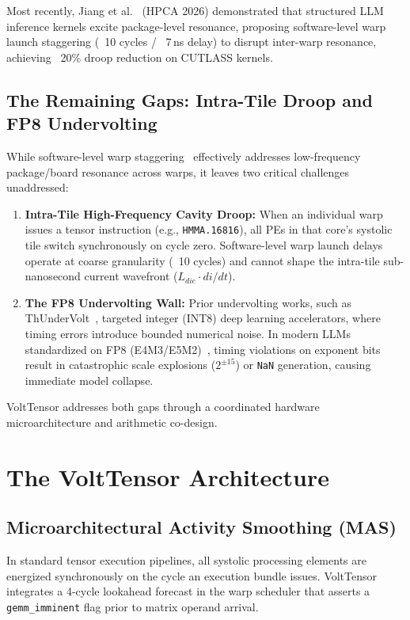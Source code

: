 \documentclass[conference]{IEEEtran}
\begin{document}
Most recently, Jiang et al.~\cite{jiang2026mitigating} (HPCA 2026) demonstrated that structured LLM inference kernels excite package-level resonance, proposing software-level warp launch staggering (~10 cycles / ~7\,ns delay) to disrupt inter-warp resonance, achieving ~20\% droop reduction on CUTLASS kernels.

\subsection{The Remaining Gaps: Intra-Tile Droop and FP8 Undervolting}
While software-level warp staggering~\cite{jiang2026mitigating} effectively addresses low-frequency package/board resonance across warps, it leaves two critical challenges unaddressed:
\begin{enumerate}
    \item \textbf{Intra-Tile High-Frequency Cavity Droop:} When an individual warp issues a tensor instruction (e.g., \texttt{HMMA.16816}), all PEs in that core's systolic tile switch synchronously on cycle zero. Software-level warp launch delays operate at coarse granularity (~10 cycles) and cannot shape the intra-tile sub-nanosecond current wavefront ($L_{die} \cdot di/dt$).
    \item \textbf{The FP8 Undervolting Wall:} Prior undervolting works, such as ThUnderVolt~\cite{zhang2021thundervolt}, targeted integer (INT8) deep learning accelerators, where timing errors introduce bounded numerical noise. In modern LLMs standardized on FP8 (E4M3/E5M2)~\cite{micikevicius2022fp8}, timing violations on exponent bits result in catastrophic scale explosions ($2^{\pm 15}$) or \texttt{NaN} generation, causing immediate model collapse.
\end{enumerate}

VoltTensor addresses both gaps through a coordinated hardware microarchitecture and arithmetic co-design.

\section{The VoltTensor Architecture}

\subsection{Microarchitectural Activity Smoothing (MAS)}
In standard tensor execution pipelines, all systolic processing elements are energized synchronously on the cycle an execution bundle issues. VoltTensor integrates a 4-cycle lookahead forecast in the warp scheduler that asserts a \texttt{gemm\_imminent} flag prior to matrix operand arrival. 
\end{document}
